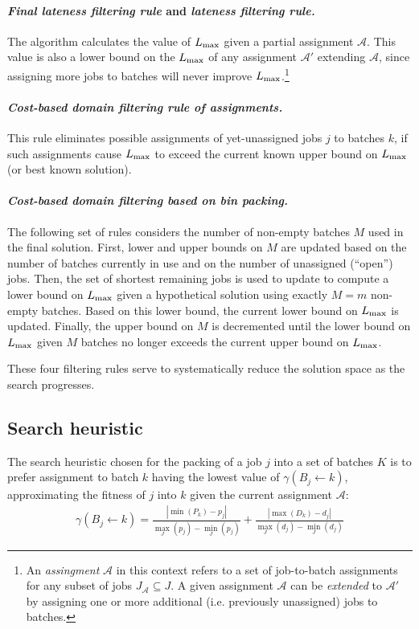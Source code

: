 \documentclass[13pt, letterpaper, oneside]{book}
\begin{document}
\paragraph{\textit{Final lateness filtering rule} and \textit{lateness filtering
rule.}} The algorithm calculates the value
of $L_{\text{max}}$ given a partial assignment $\mathcal{A}$. This value is also a lower
bound on the $L_{\text{max}}$ of any assignment $\mathcal{A}'$ extending $\mathcal{A}$,
since assigning more jobs to batches will never improve $L_{\text{max}}$.\footnote{An
\textit{assingment} $\mathcal{A}$ in this context refers to a set of
job-to-batch assignments for any subset of jobs $J_\mathcal{A} \subseteq J$. A
given assignment $\mathcal{A}$ can be \textit{extended} to $\mathcal{A}'$ by
assigning one or more additional (i.e.  previously unassigned) jobs to batches.}

\paragraph{\textit{Cost-based domain filtering rule of assignments.}} This rule
eliminates possible assignments of yet-unassigned jobs $j$ to batches $k$, if
such assignments cause $L_{\text{max}}$ to exceed the current known upper bound on
$L_{\text{max}}$ (or best known solution).

\paragraph{\textit{Cost-based domain filtering based on bin packing.}} The
following set of rules considers the number of non-empty batches $M$ used in the
final solution. First, lower and upper bounds on $M$ are updated based on the
number of batches currently in use and on the number of unassigned (``open'')
jobs. Then, the set of shortest remaining jobs is used to update to compute a
lower bound on $L_{\text{max}}$ given a hypothetical solution using exactly $M = m$
non-empty batches. Based on this lower bound, the current lower bound on
$L_{\text{max}}$ is updated. Finally, the upper bound on $M$ is decremented until the
lower bound on $L_{\text{max}}$ given $M$ batches no longer exceeds the current upper
bound on $L_{\text{max}}$.

These four filtering rules serve to systematically reduce the solution space as
the search progresses.

\subsection{Search heuristic}
\label{sec:bestfit}
The search heuristic chosen for the packing of a job $j$ into a set of batches
$K$ is to prefer assignment to batch $k$ having the lowest value of $\gamma(B_j
\leftarrow k)$, approximating the fitness of $j$ into $k$ given the current
assignment $\mathcal{A}$:
\begin{align}
\gamma(B_j \leftarrow k) = \frac{ |\min(P_k) - p_j| }{\underset{J}{\max}(p_j) -
\underset{J}{\min}(p_j)} + \frac{ |\max(D_k) - d_j| }{\underset{J}{\max}(d_j) -
\underset{J}{\min}(d_j)}
\end{align}
\end{document}
